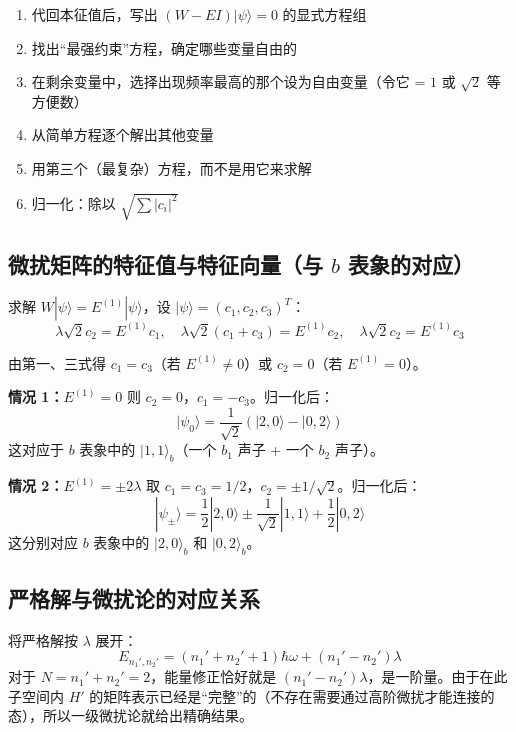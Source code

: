 \begin{thinkbox}
\begin{enumerate}
    \item 代回本征值后，写出 $(W - EI)|\psi\rangle = 0$ 的显式方程组
    \item 找出``最强约束''方程，确定哪些变量自由的
    \item 在剩余变量中，选择出现频率最高的那个设为自由变量（令它 = $1$ 或 $\sqrt{2}$ 等方便数）
    \item 从简单方程逐个解出其他变量
    \item 用第三个（最复杂）方程，而不是用它来求解
    \item 归一化：除以 $\sqrt{\sum |c_i|^2}$
\end{enumerate}
\end{thinkbox}

\subsection[微扰矩阵的特征值与特征向量（与 b 表象的对应）]{微扰矩阵的特征值与特征向量（与 $b$ 表象的对应）}

求解 $W |\psi\rangle = E^{(1)} |\psi\rangle$，设 $|\psi\rangle = (c_1, c_2, c_3)^T$：
\[
\lambda\sqrt{2} c_2 = E^{(1)} c_1, \quad \lambda\sqrt{2}(c_1 + c_3) = E^{(1)} c_2, \quad \lambda\sqrt{2} c_2 = E^{(1)} c_3
\]

由第一、三式得 $c_1 = c_3$（若 $E^{(1)} \neq 0$）或 $c_2 = 0$（若 $E^{(1)} = 0$）。

\textbf{情况 1：}$E^{(1)} = 0$
则 $c_2 = 0$，$c_1 = -c_3$。归一化后：
\[
|\psi_0\rangle = \frac{1}{\sqrt{2}}(|2,0\rangle - |0,2\rangle)
\]
这对应于 $b$ 表象中的 $|1,1\rangle_b$（一个 $b_1$ 声子 + 一个 $b_2$ 声子）。

\textbf{情况 2：}$E^{(1)} = \pm 2\lambda$
取 $c_1 = c_3 = 1/2$，$c_2 = \pm 1/\sqrt{2}$。归一化后：
\[
|\psi_{\pm}\rangle = \frac{1}{2}|2,0\rangle \pm \frac{1}{\sqrt{2}}|1,1\rangle + \frac{1}{2}|0,2\rangle
\]
这分别对应 $b$ 表象中的 $|2,0\rangle_b$ 和 $|0,2\rangle_b$。

\subsection{严格解与微扰论的对应关系}

将严格解按 $\lambda$ 展开：
\[
E_{n_1',n_2'} = (n_1'+n_2'+1)\hbar\omega + (n_1'-n_2')\lambda
\]
对于 $N = n_1'+n_2' = 2$，能量修正恰好就是 $(n_1'-n_2')\lambda$，是一阶量。由于在此子空间内 $H'$ 的矩阵表示已经是``完整''的（不存在需要通过高阶微扰才能连接的态），所以一级微扰论就给出精确结果。

